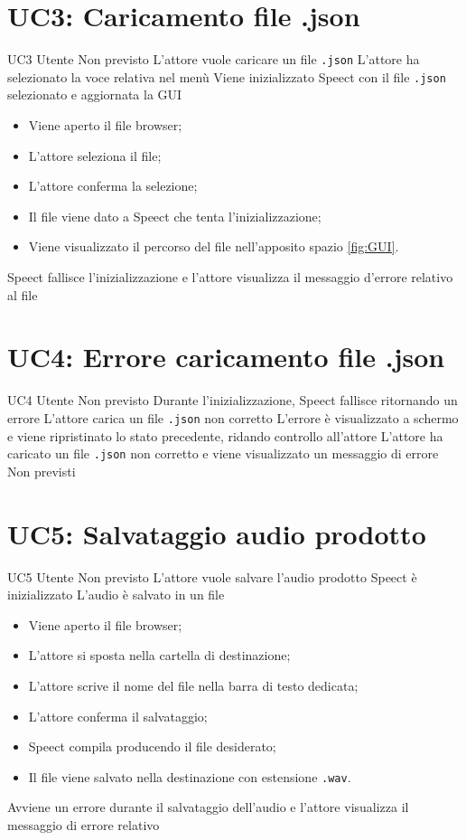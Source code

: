 \documentclass[../AnalisideiRequisiti.tex]{subfiles}
\begin{document}
	\section{UC3: Caricamento file .json}
	\UserCase
	{UC3}
	{Utente}
	{Non previsto}
	{L'attore vuole caricare un file \verb|.json|}
	{L'attore ha selezionato la voce relativa nel menù }
	{Viene inizializzato Speect con il file \verb|.json| selezionato e aggiornata la GUI}
	{
		\begin{itemize}
			\item{} Viene aperto il file browser;
			\item{} L'attore seleziona il file;
			\item{} L'attore conferma la selezione;
			\item{} Il file viene dato a Speect che tenta l'inizializzazione;
			\item{} Viene visualizzato il percorso del file nell'apposito spazio \ref{fig:GUI}.
		\end{itemize}
	}
	{Speect fallisce l'inizializzazione e l'attore visualizza il messaggio d'errore relativo al file }
	
	\section{UC4: Errore caricamento file .json}
	\UserCase
	{UC4}
	{Utente}
	{Non previsto}
	{Durante l'inizializzazione, Speect fallisce ritornando un errore}
	{L'attore carica un file \verb|.json| non corretto}
	{L'errore è visualizzato a schermo e viene ripristinato lo stato precedente, ridando controllo all'attore}
	{L'attore ha caricato un file \verb|.json| non corretto e viene visualizzato un messaggio di errore}
	{Non previsti}

\section{UC5: Salvataggio audio prodotto}
\UserCase
{UC5}
{Utente}
{Non previsto}
{L'attore vuole salvare l'audio prodotto}
{Speect è inizializzato }
{L'audio è salvato in un file}
{
		\begin{itemize}
		\item{} Viene aperto il file browser;
		\item{} L'attore si sposta nella cartella di destinazione;
		\item{} L'attore scrive il nome del file nella barra di testo dedicata;
		\item{} L'attore conferma il salvataggio;
		\item{} Speect compila producendo il file desiderato;
		\item{} Il file viene salvato nella destinazione con estensione \verb|.wav|.
		\end{itemize}
}
{Avviene un errore durante il salvataggio dell'audio e l'attore visualizza il messaggio di errore relativo }
		
\end{document}
